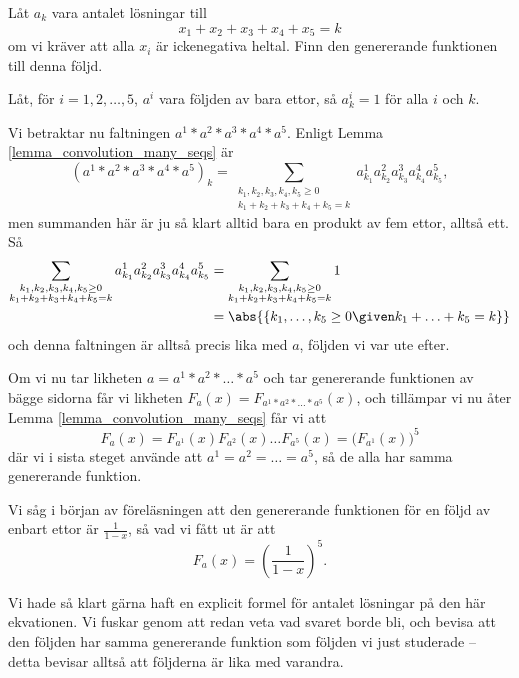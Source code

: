 \documentclass[nobib]{tufte-handout}
\begin{document}
\begin{example}
    Låt $a_k$ vara antalet lösningar till
    $$x_1 + x_2 + x_3 + x_4 + x_5 = k$$
    om vi kräver att alla $x_i$ är ickenegativa heltal. Finn den genererande funktionen till denna följd.

    Låt, för $i = 1,2,\ldots,5$, $a^i$ vara följden av bara ettor, så $a_k^i = 1$ för alla $i$ och $k$.
    
    Vi betraktar nu faltningen $a^1*a^2*a^3*a^4*a^5$. Enligt Lemma \ref{lemma_convolution_many_seqs} är
    $$(a^1*a^2*a^3*a^4*a^5)_k = \sum_{\substack{k_1, k_2, k_3, k_4, k_5 \geq 0\\k_1 + k_2 + k_3 + k_4 + k_5 = k}} a^1_{k_1}a^2_{k_2} a^3_{k_3} a^4_{k_4} a^5_{k_5},$$
    men summanden här är ju så klart alltid bara en produkt av fem ettor, alltså ett. Så
    \begin{align*}
        \sum_{\substack{k_1, k_2, k_3, k_4, k_5 \geq 0\\k_1 + k_2 + k_3 + k_4 + k_5 = k}} a^1_{k_1}a^2_{k_2} a^3_{k_3} a^4_{k_4} a^5_{k_5} &= \sum_{\substack{k_1, k_2, k_3, k_4, k_5 \geq 0\\k_1 + k_2 + k_3 + k_4 + k_5 = k}} 1\\
        &= \abs{\left\{k_1, \ldots, k_5 \geq 0 \given k_1 + \ldots + k_5 = k \right\}}
    \end{align*}
    och denna faltningen är alltså precis lika med $a$, följden vi var ute efter.

    Om vi nu tar likheten $a = a^1*a^2*\ldots*a^5$ och tar genererande funktionen av bägge sidorna får vi likheten $F_a(x) = F_{a^1*a^2*\ldots*a^5}(x)$, och tillämpar vi nu åter Lemma \ref{lemma_convolution_many_seqs} får vi att
    $$F_a(x) = F_{a^1}(x)F_{a^2}(x)\ldots F_{a^5}(x) = \Big(F_{a^1}(x)\Big)^5$$
    där vi i sista steget använde att $a^1 = a^2 = \ldots = a^5$, så de alla har samma genererande funktion.

    Vi såg i början av föreläsningen att den genererande funktionen för en följd av enbart ettor är $\frac{1}{1-x}$, så vad vi fått ut är att
    $$F_a(x) = \left(\frac{1}{1-x}\right)^5.$$
\end{example}

Vi hade så klart gärna haft en explicit formel för antalet lösningar på den här ekvationen. Vi fuskar genom att redan veta vad svaret borde bli, och bevisa att den följden har samma genererande funktion som följden vi just studerade -- detta bevisar alltså att följderna är lika med varandra.
\end{document}
